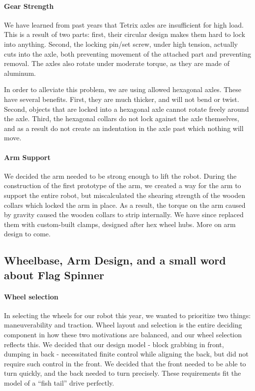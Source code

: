 \paragraph{Gear Strength} We have learned from past years that Tetrix axles are insufficient for high load. This is a result of two parts: first, their circular design makes them hard to lock into anything. Second, the locking pin/set screw, under high tension, actually cuts into the axle, both preventing movement of the attached part and preventing removal. The axles also rotate under moderate torque, as they are made of aluminum.

In order to alleviate this problem, we are using allowed hexagonal axles. These have several benefits. First, they are much thicker, and will not bend or twist. Second, objects that are locked into a hexagonal axle cannot rotate freely around the axle. Third, the hexagonal collars do not lock against the axle themselves, and as a result do not create an indentation in the axle past which nothing will move. 

\paragraph{Arm Support} We decided the arm needed to be strong enough to lift the robot. During the construction of the first prototype of the arm, we created a way for the arm to support the entire robot, but miscalculated the shearing strength of the wooden collars which locked the arm in place. As a result, the torque on the arm caused by gravity caused the wooden collars to strip internally. We have since replaced them with custom-built clamps, designed after hex wheel hubs. More on arm design to come.

\subsection{Wheelbase, Arm Design, and a small word about Flag Spinner}
\paragraph{Wheel selection} In selecting the wheels for our robot this year, we wanted to prioritize two things: maneuverability and traction. Wheel layout and selection is the entire deciding component in how these two motivations are balanced, and our wheel selection reflects this. We decided that our design model - block grabbing in front, dumping in back - necessitated finite control while aligning the back, but did not require such control in the front. We decided that the front needed to be able to turn quickly, and the back needed to turn precisely. These requirements fit the model of a ``fish tail'' drive perfectly.

